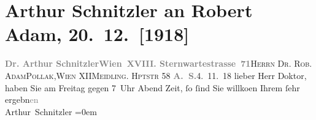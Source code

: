 

         
         \renewcommand{\erwaehntePersonen}{Personen: Robert Adam}
         \renewcommand{\erwaehnteOrte}{Orte: Meidlinger Hauptstraße, Sternwartestraße, Wien, XII., Meidling}
         \renewcommand{\erwaehnteWerke}{}
               \section[Arthur Schnitzler an Robert Adam, 20. 12. {[}1918{]}]{ Arthur Schnitzler an Robert Adam, 20. 12. {[}1918{]}}\nopagebreak{}\rehead{ }\begin{ledgroupsized}[t]{13cm}\normalsize\beginnumbering{} \toendnotes[C]{\smallbreak\pagebreak[2]} 
\pstart{}{\pb}\textcolor{gray}{\textbf{Dr. Arthur Schnitzler}}\pend{}\pstart{}\textcolor{gray}{\textbf{Wien XVIII. Sternwartestrasse 71}}\pend{}{\bigskip}\pstart{}\textsc{Herrn Dr. Rob. Adam}\pend{}\pstart{}\textsc{Pollak},\pend{}\pstart{}\textsc{Wien} XII\pend{}\pstart{}\textsc{Meidling. Hptstr} 58\pend{}{\bigskip}\pstart
           {\pb}\textcolor{gray}{\textbf{A. S.}}\hfill 4. 11. 18\pend
           \pstart{}lieber Herr Doktor,\pend\pstart
           haben Sie am Freitag gegen 7 Uhr Abend Zeit, ſo ſind Sie
                  willko{\geminationm}en\pend
           \pstart
           Ihrem ſehr ergebn\textcolor{gray}{en}{\\[\baselineskip]}\spacefill\mbox{Arthur Schnitzler}\pend
           \leftskip=0em{}
         
         \endnumbering{}\end{ledgroupsized}  \newcommand{\dateiname}{L02316}\newcommand{\titel}{Arthur Schnitzler an Robert Adam, 20. 12. [1918]}\newcommand{\editorInnen}{Martin Anton Müller und Gerd-Hermann Susen}
      